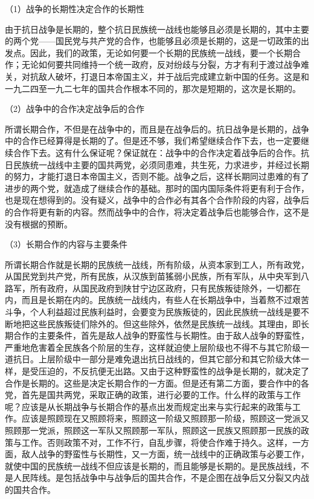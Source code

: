 \documentclass[UTF8, 12pt, a4paper]{ctexrep}
\begin{document}
（1）战争的长期性决定合作的长期性

由于抗日战争是长期的，整个抗日民族统一战线也能够且必须是长期的，其中主要的两个党——国民党与共产党的合作，也能够且必须是长期的，这是一切政策的出发点。因此，我们的政策，无论如何要一个长期的民族统一战线，要一个长期合作；无论如何要共同维持一个统一政府，反对纷歧与分裂，方才有利于渡过战争难关，对抗敌人破坏，打退日本帝国主义，并于战后完成建立新中国的任务。这是和一九二四至一九二七年的国共合作根本不同的，那次是短期的，这次是长期的。

（2）战争中的合作决定战争后的合作

所谓长期合作，不但是在战争中的，而且是在战争后的。抗日战争是长期的，战争中的合作已经算得是长期的了。但是还不够，我们希望继续合作下去，也一定要继续合作下去。这有什么保证呢？保证就在：战争中的合作决定着战争后的合作。抗日民族统一战线中主要的国共两党，必须同患难，共生死，力求进步，并经过长期的努力，才能打退日本帝国主义，否则不能。战争之后，这样长期同过患难的有了进步的两个党，就造成了继续合作的基础。那时的国内国际条件将更有利于合作，也是现在想得到的。没有疑义，战争中的合作必有其各个合作阶段的内容，战争后的合作将更有新的内容。然而战争中的合作，将决定着战争后也能够合作，这不是没有根据的预断。

（3）长期合作的内容与主要条件

所谓长期合作就是长期的民族统一战线，所有阶级，从资本家到工人，所有政党，从国民党到共产党，所有民族，从汉族到苗猺弱小民族，所有军队，从中央军到八路军，所有政府，从国民政府到陕甘宁边区政府，只有民族叛徒除外，一切都在内，而且是长期在内的。民族统一战线内，有些人在长期战争中，当着熬不过艰苦斗争，个人利益超过民族利益时，会要变为民族叛徒的，因此民族统一战线是要不断地把这些民族叛徒们除外的。但这些除外，依然是民族统一战线。其理由，即长期合作的主要条件，首先是敌人战争的野蛮性与长期性。由于敌人战争的野蛮性，严重地危害着全民族各个阶层的生存，这样就迫使上层阶级也不得不与其它阶级一道抗日。上层阶级中一部分是难免退出抗日战线的，但其它部分和其它阶级大体一样，是受压迫的，不反抗便无出路。又由于这种野蛮性的战争是长期的，就决定了合作是长期的。这些是决定长期合作的一方面。但是还有第二方面，要合作中的各党，首先是国共两党，采取正确的政策，进行必要的工作。什么样的政策与工作呢？应该是从长期战争与长期合作的基点出发而规定出来与实行起来的政策与工作。应该是照顾现在又照顾将来，照顾这一阶级又照顾那一阶级，照顾这一党派又照顾那一党派，照顾这一军队又照顾那一军队，照顾这一民族又照顾那一民族的政策与工作。否则政策不对，工作不行，自乱步骤，将使合作难于持久。这样，一方面，敌人战争的野蛮性与长期性，又一方面，统一战线中的正确政策与必要工作，就使中国的民族统一战线不但应该是长期的，而且能够是长期的。是民族战线，不是人民阵线。是包括战争中与战争后的国共合作，不是企图在战争后又分裂又内战的国共合作。
\end{document}
